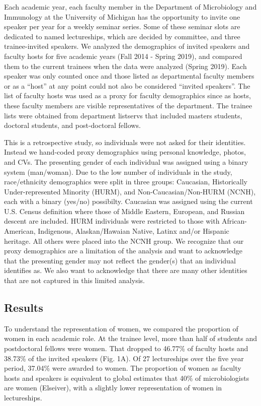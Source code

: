 \documentclass[10pt,]{article}
\begin{document}
Each academic year, each faculty member in the Department of
Microbiology and Immunology at the University of Michigan has the
opportunity to invite one speaker per year for a weekly seminar series.
Some of these seminar slots are dedicated to named lectureships, which
are decided by committee, and three trainee-invited speakers. We
analyzed the demographics of invited speakers and faculty hosts for five
academic years (Fall 2014 - Spring 2019), and compared them to the
current trainees when the data were analyzed (Spring 2019). Each speaker
was only counted once and those listed as departmental faculty members
or as a ``host'' at any point could not also be considered ``invited
speakers''. The list of faculty hosts was used as a proxy for faculty
demographics since as hosts, these faculty members are visible
representatives of the department. The trainee lists were obtained from
department listservs that included masters students, doctoral students,
and post-doctoral fellows.

This is a retrospective study, so individuals were not asked for their
identities. Instead we hand-coded proxy demographics using personal
knowledge, photos, and CVs. The presenting gender of each individual was
assigned using a binary system (man/woman). Due to the low number of
individuals in the study, race/ethnicity demographics were split in
three groups: Caucasian, Historically Under-represented Minority (HURM),
and Non-Caucasian/Non-HURM (NCNH), each with a binary (yes/no)
possibilty. Caucasian was assigned using the current U.S. Census
definition where those of Middle Eastern, European, and Russian descent
are included. HURM individuals were restricted to those with
African-American, Indigenous, Alaskan/Hawaian Native, Latinx and/or
Hispanic heritage. All others were placed into the NCNH group. We
recognize that our proxy demographics are a limitation of the analysis
and want to acknowledge that the presenting gender may not reflect the
gender(s) that an individual identifies as. We also want to acknowledge
that there are many other identities that are not captured in this
limited analysis.

\subsection{Results}\label{results}

To understand the representation of women, we compared the proportion of
women in each academic role. At the trainee level, more than half of
students and postdoctoral fellows were women. That dropped to 46.77\% of
faculty hosts and 38.73\% of the invited speakers (Fig. 1A). Of 27
lectureships over the five year period, 37.04\% were awarded to women.
The proportion of women as faculty hosts and speakers is equivalent to
global estimates that 40\% of microbiologists are women (Elseiver), with
a slightly lower representation of women in lectureships.
\end{document}
